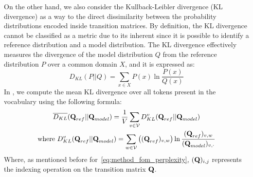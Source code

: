 On the other hand, we also consider the Kullback-Leibler divergence (KL divergence) as a way to  the direct dissimilarity between the probability distributions encoded inside transition matrices.
By definition, the KL divergence cannot be classified as a metric due to its inherent  since it is possible to identify a reference distribution and a model distribution.
The KL divergence effectively measures the divergence of the model distribution $Q$ from the reference distribution $P$ over a common domain $X$, and it is  expressed as:
\begin{equation*}
    D_{KL}(P||Q) = \sum_{x \in X}{P(x)\ln{\frac{P(x)}{Q(x)}}}
\end{equation*}
In , we compute the mean KL divergence over all tokens present in the vocabulary using the following formula:
\begin{equation}
    \label{eq:method_fom_kldiv}
    \begin{gathered}
    {\overline {D_{KL}}}(\bm{\mathbf{Q}}_{ref} || \bm{\mathbf{Q}}_{model}) = \frac{1}{V}\sum_{v \in \mathcal{V}}{D_{KL}^v(\bm{\mathbf{Q}}_{ref} || \bm{\mathbf{Q}}_{model})} \\
    \text{where}\ D_{KL}^v(\bm{\mathbf{Q}}_{ref} || \bm{\mathbf{Q}}_{model}) = \sum_{w \in \mathcal{V}}{\bigl((\bm{\mathbf{Q}}_{ref})_{v,w}\bigr)\ln{\frac{(\bm{\mathbf{Q}}_{ref})_{v,w}}{(\bm{\mathbf{Q}}_{model})_{v,\cdot}}}}
    \end{gathered}
\end{equation}
Where, as mentioned before for~\cref{eq:method_fom_perplexity}, $(\bm{\mathbf{Q}})_{i,j}$ represents the indexing operation on the transition matrix $\bm{\mathbf{Q}}$.


